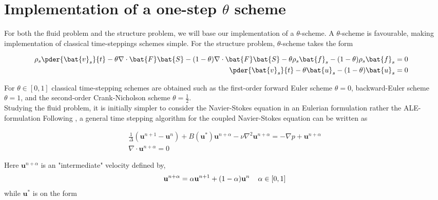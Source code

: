 \section{Implementation of a one-step $\theta$ scheme} 
For both the fluid problem and the structure problem, we will base our implementation of a $\theta$-scheme.  A $\theta$-scheme is favourable, making implementation of classical time-steppings schemes simple. For the structure problem,  $\theta$-scheme takes the form

\begin{prob}
\begin{align*}
\rho_s \pder{\bat{v}_s}{t} 
- \theta \nabla \cdot \bat{F}\bat{S}   - (1 - \theta) \nabla \cdot \bat{F}\bat{S}  
- \theta \rho_s \bat{f}_s 
- (1 - \theta) \rho_s \bat{f}_s = 0 \\
\pder{\bat{v}_s}{t} - \theta \bat{u}_s - (1 - \theta)\bat{u}_s  = 0&\\
\end{align*} 
\end{prob}

For $\theta \in [0, 1]$ classical time-stepping schemes are obtained such as the first-order forward Euler scheme $\theta = 0$, backward-Euler scheme$\theta = 1$, and the second-order Crank-Nicholson scheme $\theta = \frac{1}{2}$.  \\

Studying the fluid problem, it is initially simpler to consider the Navier-Stokes equation in an Eulerian formulation rather the ALE-formulation Following \cite{Simo1994}, a general time stepping algorithm for the coupled Navier-Stokes equation can be written as

\begin{prob}
\begin{align*}
\frac{1}{\Delta}(\mathbf{u}^{n+1} - \mathbf{u}^{n}) + 
B(\mathbf{u}^{*})\mathbf{u}^{n+\alpha}
- \nu \nabla^2 \mathbf{u}^{n + \alpha} = - \nabla p + \mathbf{u}^{n+\alpha} \\
\nabla \cdot \mathbf{u}^{n+\alpha} = 0 
\end{align*} 
\end{prob}

Here $\mathbf{u}^{n+\alpha}$ is an "intermediate" velocity defined by,
\begin{align*}
\mathbf{u}^{n+\alpha} = \alpha\mathbf{u}^{n+1} + (1 - \alpha)\mathbf{u}^{n} 
\hspace{4mm} \alpha \in [0, 1]
\end{align*}
while $\mathbf{u}^{*}$ is on the form

